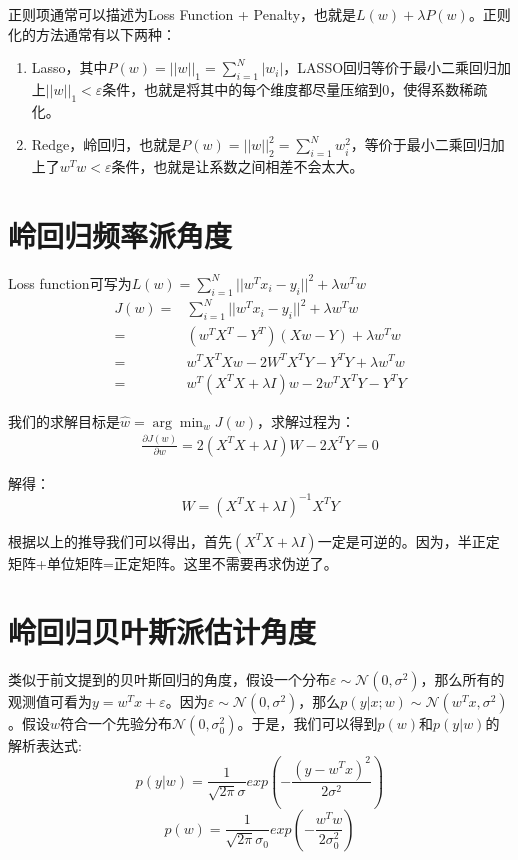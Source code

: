 \documentclass[a4paper]{article}
\begin{document}
正则项通常可以描述为Loss Function + Penalty，也就是$L(w)+\lambda P(w)$。正则化的方法通常有以下两种：
\begin{enumerate}[itemindent = 1em, itemsep = 0.4pt, parsep=0.5pt, topsep = 0.5pt]
\item Lasso，其中$P(w) = ||w||_1 = \sum_{i=1}^N|w_i|$，LASSO回归等价于最小二乘回归加上$||w||_1<\varepsilon$条件，也就是将其中的每个维度都尽量压缩到0，使得系数稀疏化。
\item Redge，岭回归，也就是$P(w)=||w||_2^2=\sum_{i=1}^Nw_i^2$，等价于最小二乘回归加上了$w^Tw<\varepsilon$条件，也就是让系数之间相差不会太大。
\end{enumerate}

\section{岭回归频率派角度}
Loss function可写为$ L(w)=\sum_{i=1}^N||w^Tx_i-y_i||^2 + \lambda w^Tw$
\begin{align}
    J(w) = & \sum_{i=1}^N||w^Tx_i-y_i||^2 + \lambda w^Tw \\
    \nonumber = & (w^TX^T - Y^T)(Xw-Y)+\lambda w^Tw \\
    \nonumber = & w^TX^TXw - 2W^TX^TY - Y^TY + \lambda w^Tw \\
    \nonumber = & w^T(X^TX + \lambda I)w - 2w^TX^TY - Y^TY 
\end{align}

我们的求解目标是$\hat{w} = \arg\min_w J(w)$，求解过程为：
\begin{align}
    \frac{\partial J(w)}{\partial w} = 2(X^TX + \lambda I)W - 2X^TY = 0
\end{align}

解得：
\begin{equation}
    W = (X^TX + \lambda I)^{-1}X^TY 
\end{equation}

根据以上的推导我们可以得出，首先$(X^TX + \lambda I)$一定是可逆的。因为，半正定矩阵+单位矩阵=正定矩阵。这里不需要再求伪逆了。

\section{岭回归贝叶斯派估计角度}
类似于前文提到的贝叶斯回归的角度，假设一个分布$\varepsilon \sim \mathcal{N}(0,\sigma^2)$，那么所有的观测值可看为$y = w^Tx + \varepsilon$。因为$\varepsilon \sim \mathcal{N}(0,\sigma^2)$，那么$p(y|x;w) \sim \mathcal{N}(w^Tx, \sigma^2)$。假设$w$符合一个先验分布$\mathcal{N}(0, \sigma_{0}^{2})$。于是，我们可以得到$p(w)$和$p(y|w)$的解析表达式:
\begin{equation}
    p(y|w) = \frac{1}{\sqrt{2\pi}\sigma}exp\left( -\frac{(y - w^Tx)^2}{2\sigma^2} \right)
\end{equation}
\begin{equation}
    p(w) = \frac{1}{\sqrt{2\pi}\sigma_0}exp\left( -\frac{w^Tw}{2\sigma_0^2} \right)
\end{equation}
\end{document}
